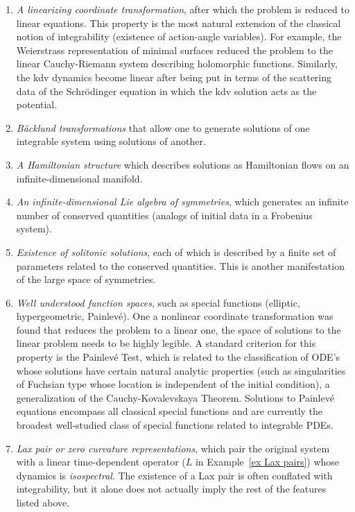 \begin{enumerate}
    \item \emph{A linearizing coordinate transformation}, after which the problem is reduced to linear equations. This property is the most natural extension of the classical notion of integrability (existence of action-angle variables). For example, the Weierstrass representation of minimal surfaces reduced the problem to the linear Cauchy-Riemann system describing holomorphic functions. Similarly, the \gls{kdv} dynamics become linear after being put in terms of the scattering data of the Schr\"odinger equation in which the \gls{kdv} solution acts as the potential. 
    \item \emph{B\"acklund transformations} that allow one to generate solutions of one integrable system using solutions of another.
    \item \emph{A Hamiltonian structure} which describes solutions as Hamiltonian flows on an infinite-dimensional manifold.
    \item \emph{An infinite-dimensional Lie algebra of symmetries}, which generates an infinite number of conserved quantities (analogs of initial data in a Frobenius system).
    \item \emph{Existence of solitonic solutions}, each of which is described by a finite set of parameters related to the conserved quantities. This is another manifestation of the large space of symmetries.
    \item \emph{Well understood function spaces}, such as special functions (elliptic, hypergeometric, Painlev\'e). One a nonlinear coordinate transformation was found that reduces the problem to a linear one, the space of solutions to the linear problem needs to be highly legible. A standard criterion for this property is the Painlev\'e Test, which is related to the classification of ODE's whose solutions have certain natural analytic properties (such as singularities of Fuchsian type whose location is independent of the initial condition), a generalization of the Cauchy-Kovalevskaya Theorem. Solutions to Painlev\'e equations encompass all classical special functions and are currently the broadest well-studied class of special functions related to integrable PDEs.
    \item \emph{Lax pair or zero curvature representations}, which pair the original system with a linear time-dependent operator ($L$ in Example~\ref{ex Lax pairs}) whose dynamics is \emph{isospectral}. The existence of a Lax pair is often conflated with integrability, but it alone does not actually imply the rest of the features listed above.
\end{enumerate} 


